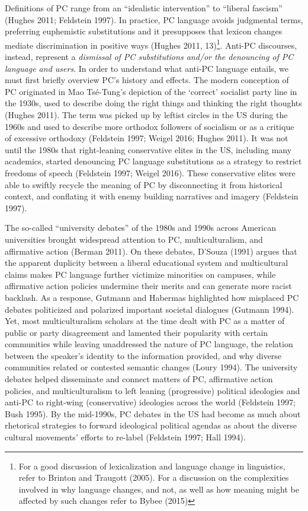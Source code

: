 \documentclass[
  12pt,
]{article}
\begin{document}
Definitions of PC range from an ``idealistic intervention'' to ``liberal
fascism'' (Hughes 2011; Feldstein 1997). In practice, PC language avoids
judgmental terms, preferring euphemistic substitutions and it
presupposes that lexicon changes mediate discrimination in positive ways
(Hughes 2011, 13)\footnote{ For a good discussion of lexicalization and
  language change in linguistics, refer to Brinton and Traugott (2005).
  For a discussion on the complexities involved in why language changes,
  and not, as well as how meaning might be affected by such changes
  refer to Bybee (2015)}. Anti-PC discourses, instead, represent a
\emph{dismissal of PC substitutions and/or the denouncing of PC language
and users}. In order to understand what anti-PC language entails, we
must first briefly overview PC's history and effects. The modern
conception of PC originated in Mao Tsé-Tung's depiction of the `correct'
socialist party line in the 1930s, used to describe doing the right
things and thinking the right thoughts (Hughes 2011). The term was
picked up by leftist circles in the US during the 1960s and used to
describe more orthodox followers of socialism or as a critique of
excessive orthodoxy (Feldstein 1997; Weigel 2016; Hughes 2011). It was
not until the 1980s that right-leaning conservative elites in the US,
including many academics, started denouncing PC language substitutions
as a strategy to restrict freedoms of speech (Feldstein 1997; Weigel
2016). These conservative elites were able to swiftly recycle the
meaning of PC by disconnecting it from historical context, and
conflating it with enemy building narratives and imagery (Feldstein
1997).

The so-called ``university debates'' of the 1980s and 1990s across
American universities brought widespread attention to PC,
multiculturalism, and affirmative action (Berman 2011). On these
debates, D'Souza (1991) argues that the apparent duplicity between a
liberal educational system and multicultural claims makes PC language
further victimize minorities on campuses, while affirmative action
policies undermine their merits and can generate more racist backlash.
As a response, Gutmann and Habermas highlighted how misplaced PC debates
politicized and polarized important societal dialogues (Gutmann 1994).
Yet, most multiculturalism scholars at the time dealt with PC as a
matter of public or party disagreement and lamented their popularity
with certain communities while leaving unaddressed the nature of PC
language, the relation between the speaker's identity to the information
provided, and why diverse communities related or contested semantic
changes (Loury 1994). The university debates helped disseminate and
connect matters of PC, affirmative action policies, and multiculturalism
to left leaning (progressive) political ideologies and anti-PC to
right-wing (conservative) ideologies across the world (Feldstein 1997;
Bush 1995). By the mid-1990s, PC debates in the US had become as much
about rhetorical strategies to forward ideological political agendas as
about the diverse cultural movements' efforts to re-label (Feldstein
1997; Hall 1994).
\end{document}
